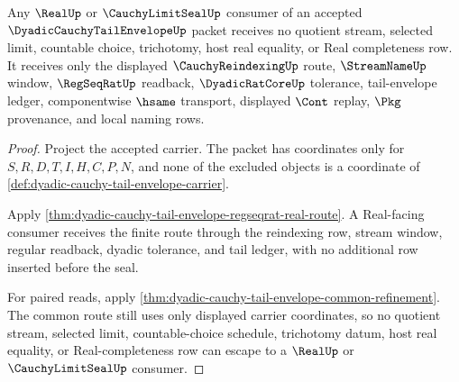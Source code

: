 \begin{theorem}
\label{thm:dyadic-cauchy-tail-envelope-nonescape}
Any $\RealUp$ or $\CauchyLimitSealUp$ consumer of an accepted $\DyadicCauchyTailEnvelopeUp$ packet receives no quotient stream, selected limit, countable choice, trichotomy, host real equality, or Real completeness row. It receives only the displayed $\CauchyReindexingUp$ route, $\StreamNameUp$ window, $\RegSeqRatUp$ readback, $\DyadicRatCoreUp$ tolerance, tail-envelope ledger, componentwise $\hsame$ transport, displayed $\Cont$ replay, $\Pkg$ provenance, and local naming rows.
\end{theorem}
\begin{proof}
Project the accepted carrier. The packet has coordinates only for $S,R,D,T,I,H,C,P,N$, and none of the excluded objects is a coordinate of \autoref{def:dyadic-cauchy-tail-envelope-carrier}.

Apply \autoref{thm:dyadic-cauchy-tail-envelope-regseqrat-real-route}. A Real-facing consumer receives the finite route through the reindexing row, stream window, regular readback, dyadic tolerance, and tail ledger, with no additional row inserted before the seal.

For paired reads, apply \autoref{thm:dyadic-cauchy-tail-envelope-common-refinement}. The common route still uses only displayed carrier coordinates, so no quotient stream, selected limit, countable-choice schedule, trichotomy datum, host real equality, or Real-completeness row can escape to a $\RealUp$ or $\CauchyLimitSealUp$ consumer.
\end{proof}

